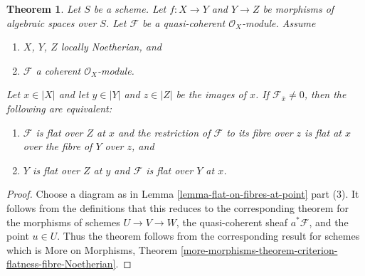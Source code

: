 \documentclass[10pt,a4paper]{amsart}
\theoremstyle{plain}
\newtheorem{theorem}[subsection]{Theorem}
\theoremstyle{definition}
\theoremstyle{remark}
\numberwithin{equation}{subsection}
\begin{document}
\begin{theorem}
\label{theorem-criterion-flatness-fibre-Noetherian}
Let $S$ be a scheme.
Let $f : X \to Y$ and $Y \to Z$ be morphisms of algebraic spaces over $S$.
Let $\mathcal{F}$ be a quasi-coherent $\mathcal{O}_X$-module.
Assume
\begin{enumerate}
\item $X$, $Y$, $Z$ locally Noetherian, and
\item $\mathcal{F}$ a coherent $\mathcal{O}_X$-module.
\end{enumerate}
Let $x \in |X|$ and let $y \in |Y|$ and $z \in |Z|$ be the images of
$x$. If $\mathcal{F}_{\overline{x}} \not = 0$, then the following are
equivalent:
\begin{enumerate}
\item $\mathcal{F}$ is flat over $Z$ at $x$ and
the restriction of $\mathcal{F}$ to its fibre over $z$
is flat at $x$ over the fibre of $Y$ over $z$, and
\item $Y$ is flat over $Z$ at $y$ and $\mathcal{F}$ is
flat over $Y$ at $x$.
\end{enumerate}
\end{theorem}

\begin{proof}
Choose a diagram as in
Lemma \ref{lemma-flat-on-fibres-at-point} part (3).
It follows from the definitions that this reduces to the
corresponding theorem for the morphisms of schemes
$U \to V \to W$, the quasi-coherent sheaf $a^*\mathcal{F}$,
and the point $u \in U$. Thus the theorem follows from the
corresponding result for schemes which is
More on Morphisms,
Theorem \ref{more-morphisms-theorem-criterion-flatness-fibre-Noetherian}.
\end{proof}
\end{document}
